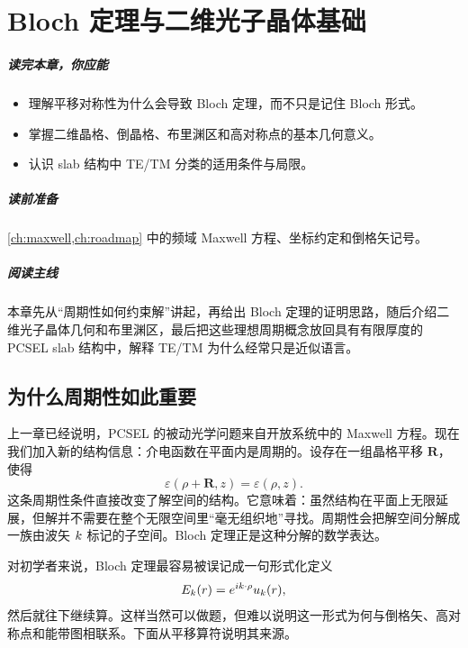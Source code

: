 ﻿%
\chapter{Bloch 定理与二维光子晶体基础}
\label{ch:bloch}

\paragraph{读完本章，你应能}
\begin{itemize}
  \item 理解平移对称性为什么会导致 Bloch 定理，而不只是记住 Bloch 形式。
  \item 掌握二维晶格、倒晶格、布里渊区和高对称点的基本几何意义。
  \item 认识 slab 结构中 TE/TM 分类的适用条件与局限。
\end{itemize}

\paragraph{读前准备}
\cref{ch:maxwell,ch:roadmap} 中的频域 Maxwell 方程、坐标约定和倒格矢记号。

\paragraph{阅读主线}
本章先从“周期性如何约束解”讲起，再给出 Bloch 定理的证明思路，随后介绍二维光子晶体几何和布里渊区，最后把这些理想周期概念放回具有有限厚度的 PCSEL slab 结构中，解释 TE/TM 为什么经常只是近似语言。

\section{为什么周期性如此重要}
上一章已经说明，PCSEL 的被动光学问题来自开放系统中的 Maxwell 方程。现在我们加入新的结构信息：介电函数在平面内是周期的。设存在一组晶格平移 $\bm{R}$，使得
\begin{equation}
\varepsilon(\rho+\bm{R},z)=\varepsilon(\rho,z).
\label{eq:lattice_periodicity}
\end{equation}
这条周期性条件直接改变了解空间的结构。它意味着：虽然结构在平面上无限延展，但解并不需要在整个无限空间里“毫无组织地”寻找。周期性会把解空间分解成一族由波矢 $k$ 标记的子空间。Bloch 定理正是这种分解的数学表达。

对初学者来说，Bloch 定理最容易被误记成一句形式化定义
\[
E_{k}(r)=e^{ik\cdot\rho}u_{k}(r),
\]
然后就往下继续算。这样当然可以做题，但难以说明这一形式为何与倒格矢、高对称点和能带图相联系。下面从平移算符说明其来源。

